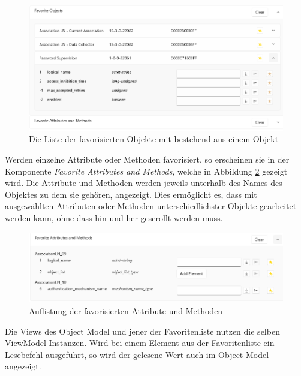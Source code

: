 \begin{figure}
   \centering
   \includegraphics[width=1.0\textwidth]{gfx/favoritesUi.png}
   \caption{
      Die Liste der favorisierten Objekte mit bestehend aus einem Objekt
      }
   \label{fig:favoritesUi}
\end{figure}

Werden einzelne Attribute oder Methoden favorisiert, so erscheinen sie in der Komponente \textit{Favorite Attributes and Methods}, welche in Abbildung \ref{fig:favoriteAttribtuesAndMethods} gezeigt wird.
Die Attribute und Methoden werden jeweils unterhalb des Names des Objektes zu dem sie gehören, angezeigt.
Dies ermöglicht es, dass mit ausgewählten Attributen oder Methoden unterschiedlichster Objekte gearbeitet werden kann, ohne dass hin und her gescrollt werden muss.
\begin{figure}
   \centering
   \includegraphics[width=1.0\textwidth]{gfx/favoriteAttributeAndMethods.png}
   \caption{
     Auflistung der favorisierten Attribute und Methoden
      }
   \label{fig:favoriteAttribtuesAndMethods}
\end{figure}

Die Views des Object Model und jener der Favoritenliste nutzen die selben ViewModel Instanzen.
Wird bei einem Element aus der Favoritenliste ein Lesebefehl ausgeführt, so wird der gelesene Wert auch im Object Model angezeigt.